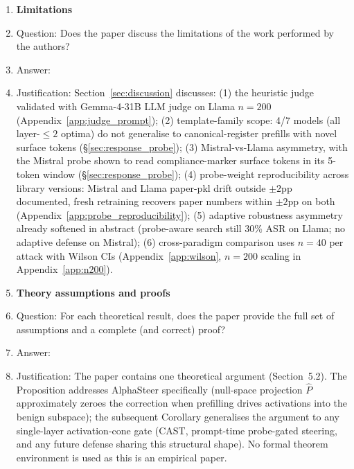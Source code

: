 \begin{enumerate}
\item {\bf Limitations}
    \item[] Question: Does the paper discuss the limitations of the work performed by the authors?
    \item[] Answer: \answerYes{}
    \item[] Justification: Section~\ref{sec:discussion} discusses: (1) the heuristic judge validated with Gemma-4-31B LLM judge on Llama $n=200$ (Appendix~\ref{app:judge_prompt}); (2) template-family scope: 4/7 models (all layer-$\leq 2$ optima) do not generalise to canonical-register prefills with novel surface tokens (\S\ref{sec:response_probe}); (3) Mistral-vs-Llama asymmetry, with the Mistral probe shown to read compliance-marker surface tokens in its 5-token window (\S\ref{sec:response_probe}); (4) probe-weight reproducibility across library versions: Mistral and Llama paper-pkl drift outside $\pm 2$pp documented, fresh retraining recovers paper numbers within $\pm 2$pp on both (Appendix~\ref{app:probe_reproducibility}); (5) adaptive robustness asymmetry already softened in abstract (probe-aware search still 30\% ASR on Llama; no adaptive defense on Mistral); (6) cross-paradigm comparison uses $n=40$ per attack with Wilson CIs (Appendix~\ref{app:wilson}, $n=200$ scaling in Appendix~\ref{app:n200}).

\item {\bf Theory assumptions and proofs}
    \item[] Question: For each theoretical result, does the paper provide the full set of assumptions and a complete (and correct) proof?
    \item[] Answer: \answerYes{}
    \item[] Justification: The paper contains one theoretical argument (Section~5.2). The Proposition addresses AlphaSteer specifically (null-space projection $\hat{P}$ approximately zeroes the correction when prefilling drives activations into the benign subspace); the subsequent Corollary generalises the argument to any single-layer activation-cone gate (CAST, prompt-time probe-gated steering, and any future defense sharing this structural shape). No formal theorem environment is used as this is an empirical paper.


\end{enumerate}
